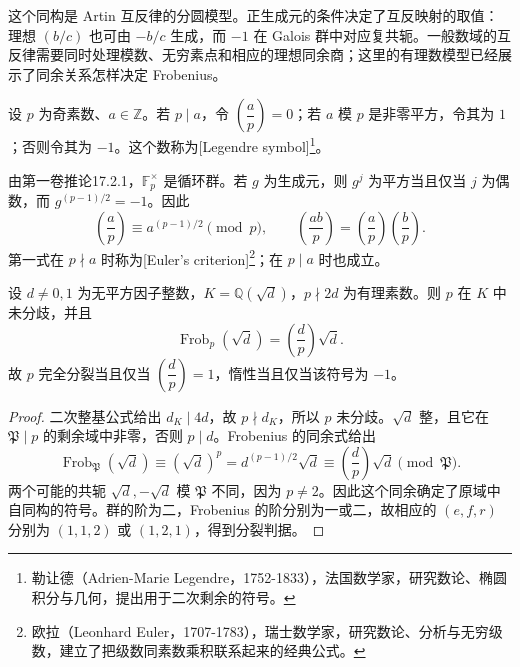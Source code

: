 这个同构是 Artin 互反律的分圆模型。正生成元的条件决定了互反映射的取值：理想 \((b/c)\) 也可由 \(-b/c\) 生成，而 \(-1\) 在 Galois 群中对应复共轭。一般数域的互反律需要同时处理模数、无穷素点和相应的理想同余商；这里的有理数模型已经展示了同余关系怎样决定 Frobenius。

\begin{definition}\label{b3:def:legendre-symbol}
	设 \(p\) 为奇素数、\(a\in\mathbb Z\)。若 \(p\mid a\)，令 \(\left(\dfrac ap\right)=0\)；若 \(a\) 模 \(p\) 是非零平方，令其为 \(1\)；否则令其为 \(-1\)。这个数称为[Legendre symbol]\footnote{勒让德（Adrien-Marie Legendre，1752-1833），法国数学家，研究数论、椭圆积分与几何，提出用于二次剩余的符号。}。
\end{definition}

由第一卷推论17.2.1，\(\mathbb F_p^\times\) 是循环群。若 \(g\) 为生成元，则 \(g^j\) 为平方当且仅当 \(j\) 为偶数，而 \(g^{(p-1)/2}=-1\)。因此
\[
	\left(\dfrac ap\right)\equiv a^{(p-1)/2}\pmod p,
	\qquad
	\left(\dfrac{ab}p\right)=\left(\dfrac ap\right)\left(\dfrac bp\right).
\]
第一式在 \(p\nmid a\) 时称为[Euler's criterion]\footnote{欧拉（Leonhard Euler，1707-1783），瑞士数学家，研究数论、分析与无穷级数，建立了把级数同素数乘积联系起来的经典公式。}；在 \(p\mid a\) 时也成立。

\begin{proposition}\label{b3:prop:quadratic-frobenius-symbol}
	设 \(d\ne0,1\) 为无平方因子整数，\(K=\mathbb Q(\sqrt d)\)，\(p\nmid2d\) 为有理素数。则 \(p\) 在 \(K\) 中未分歧，并且
	\[
		\operatorname{Frob}_p(\sqrt d)=\left(\dfrac dp\right)\sqrt d.
	\]
	故 \(p\) 完全分裂当且仅当 \(\left(\dfrac dp\right)=1\)，惰性当且仅当该符号为 \(-1\)。
\end{proposition}
\begin{proof}
	二次整基公式给出 \(d_K\mid4d\)，故 \(p\nmid d_K\)，所以 \(p\) 未分歧。\(\sqrt d\) 整，且它在 \(\mathfrak P\mid p\) 的剩余域中非零，否则 \(p\mid d\)。Frobenius 的同余式给出
	\[
		\operatorname{Frob}_{\mathfrak P}(\sqrt d)
		\equiv(\sqrt d)^p=d^{(p-1)/2}\sqrt d
		\equiv\left(\dfrac dp\right)\sqrt d\pmod{\mathfrak P}.
	\]
	两个可能的共轭 \(\sqrt d,-\sqrt d\) 模 \(\mathfrak P\) 不同，因为 \(p\ne2\)。因此这个同余确定了原域中自同构的符号。群的阶为二，Frobenius 的阶分别为一或二，故相应的 \((e,f,r)\) 分别为 \((1,1,2)\) 或 \((1,2,1)\)，得到分裂判据。
\end{proof}

